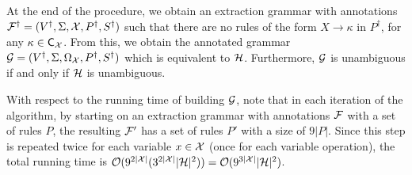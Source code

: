 At the end of the procedure, we obtain an extraction grammar with annotations $\mathcal{F}^\dagger = (V^\dagger, \Sigma, \mathcal{X}, P^\dagger, S^\dagger)$ such that there are no rules of the form $X\to\kappa$ in $P^\dagger$, for any $\kappa\in\textsf{C}_{\mathcal{X}}$. From this, we obtain the annotated grammar $\mathcal{G} = (V^\dagger, \Sigma, \Omega_{\mathcal{X}}, P^\dagger, S^\dagger)$ which is equivalent to $\mathcal{H}$. Furthermore, $\mathcal{G}$ is unambiguous if and only if $\mathcal{H}$ is unambiguous.

With respect to the running time of building $\mathcal{G}$, note that in each iteration of the algorithm, by starting on an extraction grammar with annotations $\mathcal{F}$ with a set of rules $P$, the resulting $\mathcal{F}'$ has a set of rules $P'$ with a size of $9|P|$. Since this step is repeated twice for each variable $x\in \mathcal{X}$ (once for each variable operation), 
the total running time is $\mathcal{O}(9^{2|\mathcal{X}|}(3^{2|\mathcal{X}|}|\mathcal{H}|^2)) = \mathcal{O}(9^{3|\mathcal{X}|}|\mathcal{H}|^2)$.
%
%
%
